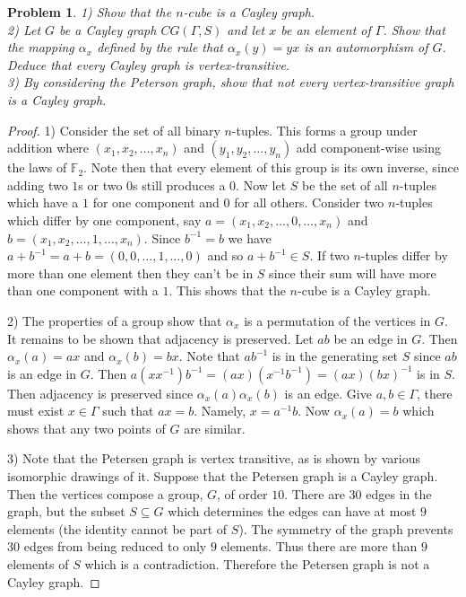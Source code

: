 \documentclass{article}
\newtheorem{problem}{Problem}
\begin{document}
\begin{flushleft}
\begin{problem}
1) Show that the $n$-cube is a Cayley graph.\\
2) Let $G$ be a Cayley graph $CG(\Gamma, S)$ and let $x$ be an element of $\Gamma$. Show that the mapping $\alpha_x$ defined by the rule that $\alpha_x(y) = yx$ is an automorphism of $G$. Deduce that every Cayley graph is vertex-transitive.\\
3) By considering the Peterson graph, show that not every vertex-transitive graph is a Cayley graph.
\end{problem}
\begin{proof}
1) Consider the set of all binary $n$-tuples. This forms a group under addition where $(x_1, x_2, \dots , x_n)$ and $(y_1, y_2, \dots , y_n)$ add component-wise using the laws of $\mathbb{F}_2$. Note then that every element of this group is its own inverse, since adding two $1$s or two $0$s still produces a $0$. Now let $S$ be the set of all $n$-tuples which have a $1$ for one component and $0$ for all others. Consider two $n$-tuples which differ by one component, say $a = (x_1, x_2, \dots , 0, \dots , x_n)$ and $b = (x_1, x_2, \dots , 1, \dots , x_n)$. Since $b^{-1} = b$ we have $a+b^{-1} = a+b = (0, 0, \dots , 1, \dots , 0)$ and so $a + b^{-1} \in S$. If two $n$-tuples differ by more than one element then they can't be in $S$ since their sum will have more than one component with a $1$. This shows that the $n$-cube is a Cayley graph.\newline

2) The properties of a group show that $\alpha_x$ is a permutation of the vertices in $G$. It remains to be shown that adjacency is preserved. Let $ab$ be an edge in $G$. Then $\alpha_x(a) = ax$ and $\alpha_x(b) = bx$. Note that $ab^{-1}$ is in the generating set $S$ since $ab$ is an edge in $G$. Then $a(xx^{-1})b^{-1} = (ax)(x^{-1}b^{-1}) = (ax)(bx)^{-1}$ is in $S$. Then adjacency is preserved since $\alpha_x(a)\alpha_x(b)$ is an edge. Give $a,b \in \Gamma$, there must exist $x \in \Gamma$ such that $ax = b$. Namely, $x = a^{-1}b$. Now $\alpha_x(a) = b$ which shows that any two points of $G$ are similar.\newline

3) Note that the Petersen graph is vertex transitive, as is shown by various isomorphic drawings of it. Suppose that the Petersen graph is a Cayley graph. Then the vertices compose a group, $G$, of order $10$. There are $30$ edges in the graph, but the subset $S \subseteq G$ which determines the edges can have at most $9$ elements (the identity cannot be part of $S$). The symmetry of the graph prevents $30$ edges from being reduced to only $9$ elements. Thus there are more than $9$ elements of $S$ which is a contradiction. Therefore the Petersen graph is not a Cayley graph.
\end{proof}


\end{flushleft}
\end{document}
